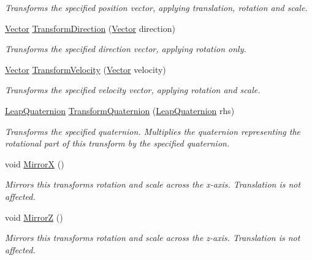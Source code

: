 \begin{DoxyCompactItemize}
\begin{DoxyCompactList}\small\item\em Transforms the specified position vector, applying translation, rotation and scale. \end{DoxyCompactList}\item 
\mbox{\hyperlink{struct_leap_1_1_vector}{Vector}} \mbox{\hyperlink{struct_leap_1_1_leap_transform_a05c90f4a484f3b55e415c0e203f78870}{Transform\+Direction}} (\mbox{\hyperlink{struct_leap_1_1_vector}{Vector}} direction)
\begin{DoxyCompactList}\small\item\em Transforms the specified direction vector, applying rotation only. \end{DoxyCompactList}\item 
\mbox{\hyperlink{struct_leap_1_1_vector}{Vector}} \mbox{\hyperlink{struct_leap_1_1_leap_transform_a415819fca9f811c44dc5d855b2099f61}{Transform\+Velocity}} (\mbox{\hyperlink{struct_leap_1_1_vector}{Vector}} velocity)
\begin{DoxyCompactList}\small\item\em Transforms the specified velocity vector, applying rotation and scale. \end{DoxyCompactList}\item 
\mbox{\hyperlink{struct_leap_1_1_leap_quaternion}{Leap\+Quaternion}} \mbox{\hyperlink{struct_leap_1_1_leap_transform_ad9658850a91beef88214dcaac6f6e6af}{Transform\+Quaternion}} (\mbox{\hyperlink{struct_leap_1_1_leap_quaternion}{Leap\+Quaternion}} rhs)
\begin{DoxyCompactList}\small\item\em Transforms the specified quaternion. Multiplies the quaternion representing the rotational part of this transform by the specified quaternion. \end{DoxyCompactList}\item 
void \mbox{\hyperlink{struct_leap_1_1_leap_transform_a1184d7a37a603a07ed15373bb08c8901}{MirrorX}} ()
\begin{DoxyCompactList}\small\item\em Mirrors this transform\textquotesingle{}s rotation and scale across the x-\/axis. Translation is not affected. \end{DoxyCompactList}\item 
void \mbox{\hyperlink{struct_leap_1_1_leap_transform_a699bd459e338da85f1ee7c2de9e466de}{MirrorZ}} ()
\begin{DoxyCompactList}\small\item\em Mirrors this transform\textquotesingle{}s rotation and scale across the z-\/axis. Translation is not affected. \end{DoxyCompactList}\end{DoxyCompactItemize}
